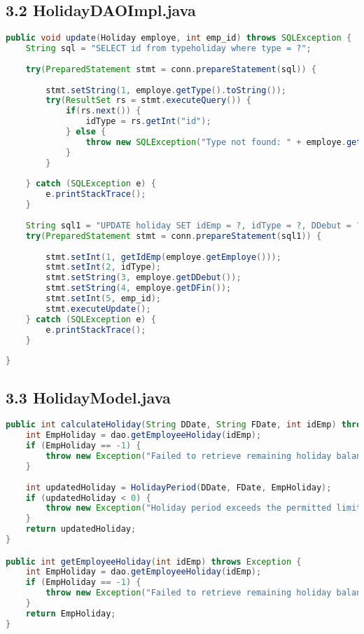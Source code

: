 \documentclass[a4paper,12pt]{report}
\begin{document}
\subsection*{\textcolor{mygreen}{3.2 HolidayDAOImpl.java}}
\begin{lstlisting}[language=Java, caption=methode pour editer une holiday]
public void update(Holiday employe, int emp_id) throws SQLException {
    String sql = "SELECT id from typeholiday where type = ?";
    
    try(PreparedStatement stmt = conn.prepareStatement(sql)) {
        
        stmt.setString(1, employe.getType().toString());
        try(ResultSet rs = stmt.executeQuery()) {
            if(rs.next()) {
                idType = rs.getInt("id");
            } else {
                throw new SQLException("Type not found: " + employe.getType().toString());
            }
        }
        
    } catch (SQLException e) {
        e.printStackTrace();
    }
    
    String sql1 = "UPDATE holiday SET idEmp = ?, idType = ?, DDebut = ?, DFin = ? WHERE id = ?";
    try(PreparedStatement stmt = conn.prepareStatement(sql1)) {
        
        stmt.setInt(1, getIdEmp(employe.getEmploye()));
        stmt.setInt(2, idType);
        stmt.setString(3, employe.getDDebut());
        stmt.setString(4, employe.getDFin());
        stmt.setInt(5, emp_id);
        stmt.executeUpdate();
    } catch (SQLException e) {
        e.printStackTrace();
    }
    
}
\end{lstlisting}

\subsection*{\textcolor{mygreen}{3.3 HolidayModel.java}}
\begin{lstlisting}[language=Java, caption=Exemple de methodes avec regles de métier]
public int calculateHoliday(String DDate, String FDate, int idEmp) throws Exception {
    int EmpHoliday = dao.getEmployeeHoliday(idEmp);
    if (EmpHoliday == -1) {
        throw new Exception("Failed to retrieve remaining holiday balance.");
    }
    
    int updatedHoliday = HolidayPeriod(DDate, FDate, EmpHoliday);
    if (updatedHoliday < 0) {
        throw new Exception("Holiday period exceeds the permitted limit.");
    }
    return updatedHoliday;
}

public int getEmployeeHoliday(int idEmp) throws Exception {
    int EmpHoliday = dao.getEmployeeHoliday(idEmp);
    if (EmpHoliday == -1) {
        throw new Exception("Failed to retrieve remaining holiday balance.");
    }
    return EmpHoliday;
}
\end{lstlisting}
\end{document}
